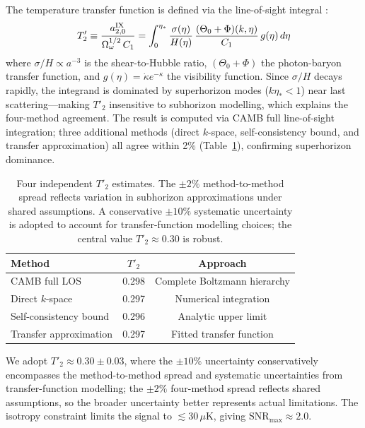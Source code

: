 \documentclass[12pt]{article}
\begin{document}
The temperature transfer function is defined via the line-of-sight integral
\citep{Lewis2000}:
\begin{equation}
  T'_2 \equiv \frac{a^{\rm IX}_{2,0}}{\Omega_\omega^{1/2}\,C_1}
  = \int_0^{\eta_*} \frac{\sigma(\eta)}{H(\eta)}\,
    \frac{(\Theta_0+\Phi)(k,\eta)}{C_1}\,g(\eta)\,d\eta
\end{equation}
where $\sigma/H \propto a^{-3}$ is the shear-to-Hubble ratio,
$(\Theta_0+\Phi)$ the photon-baryon transfer function, and
$g(\eta)=\dot{\kappa}e^{-\kappa}$ the visibility function.
Since $\sigma/H$ decays rapidly, the integrand is dominated by superhorizon modes
($k\eta_* < 1$) near last scattering---making $T'_2$ insensitive to subhorizon
modelling, which explains the four-method agreement.
The result is computed via CAMB full line-of-sight integration; three additional
methods (direct $k$-space, self-consistency bound, and transfer approximation) all
agree within 2\% (Table~\ref{tab:T2}), confirming superhorizon dominance.

\begin{table}[h]
\centering
\caption{Four independent $T'_2$ estimates. The $\pm2\%$ method-to-method spread
reflects variation in subhorizon approximations under shared assumptions.
A conservative $\pm10\%$ systematic uncertainty is adopted to account for
transfer-function modelling choices; the central value $T'_2 \approx 0.30$
is robust.}
\label{tab:T2}
\begin{tabular}{lcc}
\toprule
Method & $T'_2$ & Approach \\
\midrule
CAMB full LOS          & 0.298 & Complete Boltzmann hierarchy \\
Direct $k$-space       & 0.297 & Numerical integration \\
Self-consistency bound & 0.296 & Analytic upper limit \\
Transfer approximation & 0.297 & Fitted transfer function \\
\bottomrule
\end{tabular}
\end{table}

We adopt $T'_2 \approx 0.30 \pm 0.03$, where the $\pm10\%$ uncertainty
conservatively encompasses the method-to-method spread and systematic uncertainties
from transfer-function modelling; the $\pm2\%$ four-method spread reflects shared
assumptions, so the broader uncertainty better represents actual limitations.
The isotropy constraint limits the signal to $\lesssim30\,\mu$K, giving
$\mathrm{SNR}_{\max} \approx 2.0$.
\end{document}
